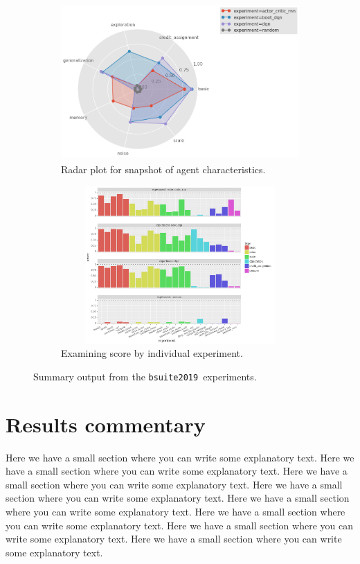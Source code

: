 \documentclass[11pt]{article}
\newcommand{\version}{\texttt{bsuite2019}}
\begin{document}
\begin{figure}[h!]
\centering
\begin{subfigure}{.45\textwidth}
  \centering
  \includegraphics[width=95mm,height=60mm,keepaspectratio]{images/radar_plot}
  \caption{Radar plot for snapshot of agent characteristics.}
  \label{fig:memory_len_score}
\end{subfigure}
\hspace{10mm}
\begin{subfigure}{.45\textwidth}
  \centering
  \includegraphics[width=95mm,height=60mm,keepaspectratio]{images/bar_plot}
  \caption{Examining score by individual experiment.}
  \label{fig:memory_len_scaling}
\end{subfigure}
\caption{Summary output from the \version\  experiments.}
\label{fig:test}
\end{figure}


\section{Results commentary}
Here we have a small section where you can write some explanatory text.
Here we have a small section where you can write some explanatory text.
Here we have a small section where you can write some explanatory text.
Here we have a small section where you can write some explanatory text.
Here we have a small section where you can write some explanatory text.
Here we have a small section where you can write some explanatory text.
Here we have a small section where you can write some explanatory text.
Here we have a small section where you can write some explanatory text.



\newpage
{
\small


}
\end{document}
